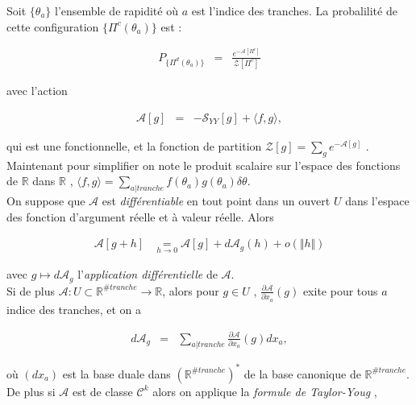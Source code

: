 Soit  $\{\theta_a \}$ l'ensemble de rapidité où $a$ est l'indice des tranches. La probalilité de cette configuration $\{ \Pi^c(\theta_a) \}$ est : 
	
	\begin{eqnarray}
		P_{\{ \Pi^d(\theta_a)\} } & = & \frac{ \displaystyle e^{ - \mathcal{A}[\Pi^c]  }}{\mathcal{Z}[\Pi^c]} 	
	\end{eqnarray}
	
	avec l'action 
	\begin{aff}
	\begin{eqnarray}
		\mathcal{A}[g] & = &  -\mathcal{S}_{YY}[g] + \langle f , g \rangle ,	
	\end{eqnarray}	
	\end{aff}

	
	qui est une fonctionnelle, et la fonction de partition $\mathcal{Z}[g] = \sum_g e^{-\mathcal{A}[g]}$ .
	Maintenant pour simplifier on note le produit scalaire sur l'espace des fonctions de $\mathbb{R}$ dans $\mathbb{R}$ , $\langle f , g \rangle = \sum_{a\vert tranche} f(\theta_a) g ( \theta_a) \delta \theta $.\\
	
On suppose que $\mathcal{A}$ est {\em différentiable} en tout point dans un ouvert $U$ dans l'espace des fonction d'argument réelle et à valeur réelle. Alors 

\begin{eqnarray*}
	\mathcal{A}[g + h]  & \underset{ h \to 0 }{=} \mathcal{A}[g] + d\mathcal{A}_g(h) + o(\Vert h \Vert ) 		
\end{eqnarray*}

avec $g \mapsto d\mathcal{A}_g$ l'{\em application différentielle} de $\mathcal{A}$.\\

Si de plus $\mathcal{A} \colon U \subset \mathbb{R}^{\# tranche} \to \mathbb{R}$, alors pour $g \in U $ , $\displaystyle \frac{ \partial \mathcal{A}}{ \partial x_a}(g)$ exite pour tous $a$ indice des tranches, et on a   
	
\begin{eqnarray*}
	d\mathcal{A}_g & = & \sum_{a\vert tranche} \frac{ \partial \mathcal{A}}{ \partial x_a}(g) d x_a ,		
\end{eqnarray*}

où $(d x_a )$ est la base duale dans $(\mathbb{R}^{\# tranche})^\ast$ de la base canonique de $\mathbb{R}^{\# tranche}$.\\

De plus si $\mathcal{A}$ est de classe $\mathcal{C}^k$ alors on applique la {\em formule de Taylor-Youg} ,

